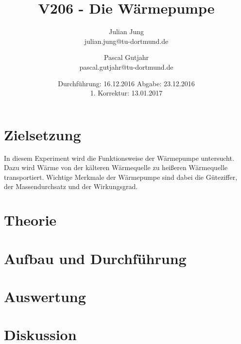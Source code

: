 

\title{V206 - Die Wärmepumpe}
\author{Julian Jung \\ julian.jung@tu-dortmund.de
  \and Pascal Gutjahr \\ pascal.gutjahr@tu-dortmund.de}
  \date{Durchführung: 16.12.2016
  \hspace{3em}
  Abgabe: 23.12.2016 \\
  1. Korrektur: 13.01.2017}
  
\maketitle
\newpage
\tableofcontents
\newpage
\section{Zielsetzung}
In diesem Experiment wird die Funktionsweise der Wärmepumpe untersucht. Dazu wird
Wärme von der kälteren Wärmequelle zu heißeren Wärmequelle transportiert. Wichtige
Merkmale der Wärmepumpe sind dabei die Güteziffer, der Massendurchsatz und der
Wirkungsgrad.
\section{Theorie}
 
\section{Aufbau und Durchführung}
 
 \newpage
\section{Auswertung}
 
\section{Diskussion}
 
\printbibliography

